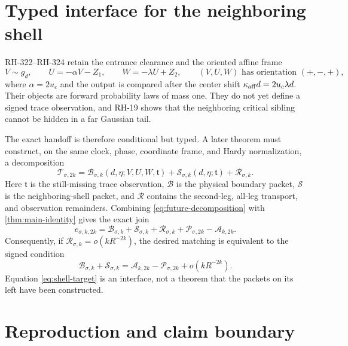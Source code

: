 \documentclass[11pt]{article}
\theoremstyle{remark}
\newcommand{\1}{\mathbf 1}
\newcommand{\cA}{\mathcal A}
\newcommand{\cB}{\mathcal B}
\newcommand{\cP}{\mathcal P}
\newcommand{\cR}{\mathcal R}
\newcommand{\cS}{\mathcal S}
\newcommand{\cT}{\mathcal T}
\begin{document}
\section{Typed interface for the neighboring shell}

RH-322--RH-324 retain the entrance clearance and the oriented affine frame
\begin{equation}
 V\sim g_d,
 \qquad U=-\alpha V-Z_1,
 \qquad W=-\lambda U+Z_2,
 \qquad (V,U,W)\text{ has orientation }(+,-,+),
 \label{eq:local-frame}
\end{equation}
where $\alpha=2u_c$ and the output is compared after the center shift
$\kappa_{\rm aff}d=2u_c\lambda d$.  Their objects are forward probability
laws of mass one.  They do not yet define a signed trace observation, and
RH-19 shows that the neighboring critical sibling cannot be hidden in a far
Gaussian tail.

The exact handoff is therefore conditional but typed.  A later theorem must
construct, on the same clock, phase, coordinate frame, and Hardy
normalization, a decomposition
\begin{equation}
 \cT_{\sigma,2k}
 =\cB_{\sigma,k}(d,\eta;V,U,W,\mathfrak t)
 +\cS_{\sigma,k}(d,\eta;\mathfrak t)
 +\cR_{\sigma,k}.
 \label{eq:future-decomposition}
\end{equation}
Here $\mathfrak t$ is the still-missing trace observation, $\cB$ is the
physical boundary packet, $\cS$ is the neighboring-shell packet, and $\cR$
contains the second-leg, all-leg transport, and observation remainders.
Combining \eqref{eq:future-decomposition} with
\cref{thm:main-identity} gives the exact join
\begin{equation}
 e_{\sigma,k,2k}
 =\cB_{\sigma,k}+\cS_{\sigma,k}+\cR_{\sigma,k}
 +\cP_{\sigma,2k}-\cA_{k,2k}.
 \label{eq:typed-join}
\end{equation}
Consequently, if $\cR_{\sigma,k}=o(kR^{-2k})$, the desired matching is
equivalent to the signed condition
\begin{equation}
 \boxed{
 \cB_{\sigma,k}+\cS_{\sigma,k}
 =\cA_{k,2k}-\cP_{\sigma,2k}+o(kR^{-2k}).}
 \label{eq:shell-target}
\end{equation}
Equation \eqref{eq:shell-target} is an interface, not a theorem that the
packets on its left have been constructed.

\section{Reproduction and claim boundary}
\end{document}
